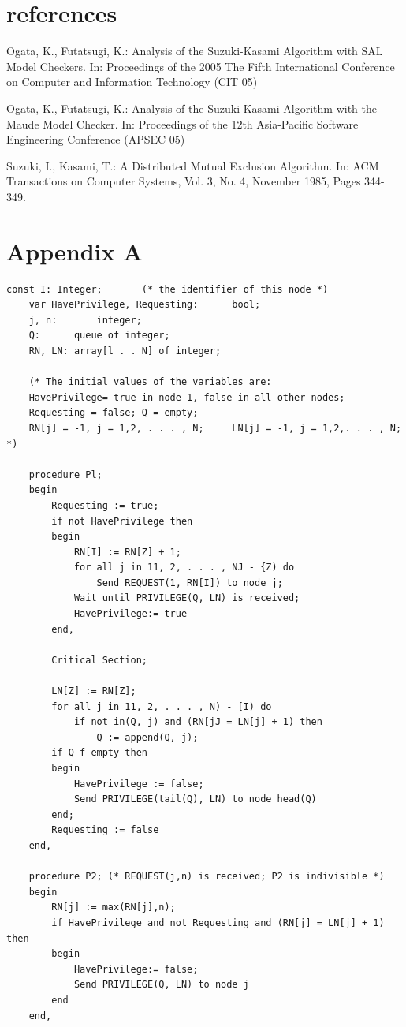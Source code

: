\documentclass[a4paper,10pt]{llncs}
\begin{document}
\section{references}
\begin{thebibliography}{4}

Ogata, K., Futatsugi, K.: Analysis of the Suzuki-Kasami Algorithm with SAL Model Checkers. In: 
Proceedings of the 2005 The Fifth International Conference on Computer and Information Technology (CIT 05)

 Ogata, K., Futatsugi, K.: Analysis of the Suzuki-Kasami Algorithm with the Maude Model Checker. In: 
Proceedings of the 12th Asia-Pacific Software Engineering Conference (APSEC 05)

 Suzuki, I., Kasami, T.: A Distributed Mutual Exclusion Algorithm. In: 
ACM Transactions on Computer Systems, Vol. 3, No. 4, November 1985, Pages 344-349.


\end{thebibliography}

\appendix
\section{Appendix A}
\label{sec:ska}

\begin{lstlisting}[label=some-code,caption=Suzuki and Kazami's algorithm]
const I: Integer;		(* the identifier of this node *)
	var HavePrivilege, Requesting:		bool;
	j, n:	 	integer;
	Q: 		queue of integer;
	RN, LN:	array[l . . N] of integer;

	(* The initial values of the variables are:
	HavePrivilege= true in node 1, false in all other nodes;
	Requesting = false; Q = empty;
	RN[j] = -1, j = 1,2, . . . , N;  	LN[j] = -1, j = 1,2,. . . , N; *)

	procedure Pl;
	begin
		Requesting := true;
		if not HavePrivilege then
		begin
			RN[I] := RN[Z] + 1;
			for all j in 11, 2, . . . , NJ - {Z) do
				Send REQUEST(1, RN[I]) to node j;
			Wait until PRIVILEGE(Q, LN) is received;
			HavePrivilege:= true
		end,
	
		Critical Section;

		LN[Z] := RN[Z];
		for all j in 11, 2, . . . , N) - [I) do
			if not in(Q, j) and (RN[jJ = LN[j] + 1) then
				Q := append(Q, j);
		if Q f empty then
		begin
			HavePrivilege := false;
			Send PRIVILEGE(tail(Q), LN) to node head(Q)
		end;
		Requesting := false
	end,

	procedure P2; (* REQUEST(j,n) is received; P2 is indivisible *)
	begin
		RN[j] := max(RN[j],n);
		if HavePrivilege and not Requesting and (RN[j] = LN[j] + 1) then
		begin
			HavePrivilege:= false;
			Send PRIVILEGE(Q, LN) to node j
		end
	end,

\end{lstlisting}
\end{document}
